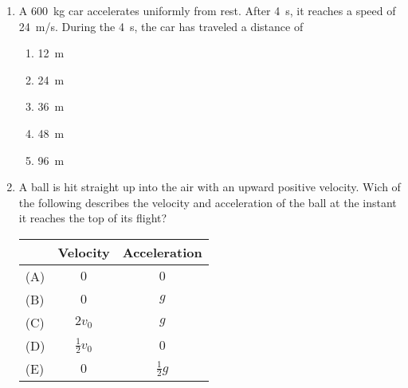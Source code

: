 \documentclass{../../../oss-apphys}
\begin{document}
\begin{multicols}{2}
\begin{enumerate}[resume,leftmargin=18pt]
  \item A \SI{600}{\kilo\gram} car accelerates uniformly from rest. After
    \SI{4}{\second}, it reaches a speed of \SI{24}{m/s}. During the
    \SI{4}{\second}, the car has traveled a distance of
    \begin{enumerate}[noitemsep,topsep=0pt,leftmargin=18pt,label=(\Alph*)]
    \item\SI{12}{\metre}
    \item\SI{24}{\metre}
    \item\SI{36}{\metre}
    \item\SI{48}{\metre}
    \item\SI{96}{\metre}
    \end{enumerate}
    \columnbreak
      
      
  \item A ball is hit straight up into the air with an upward positive
    velocity. Wich of the following describes the velocity and acceleration
    of the ball at the instant it reaches the top of its flight?
    \begin{tabular}{lcc}
      & Velocity & Acceleration\\ \hline
      (A) & $0$ & $0$\\
      (B) & $0$ & $g$\\
      (C) & $2v_0$ & $g$\\
      (D) & $\frac{1}{2}v_0$ & $0$\\
      (E) & $0$ & $\frac{1}{2}g$
    \end{tabular}
    

\end{enumerate}
\end{multicols}
\end{document}

